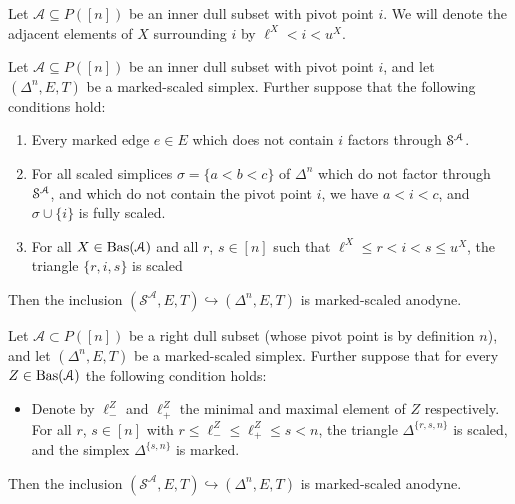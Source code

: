 \documentclass[main.tex]{subfiles}
\begin{document}
\begin{definition}
  Let $\mathcal{A} \subseteq P([n])$ be an inner dull subset with pivot point $i$. We will denote the adjacent elements of $X$ surrounding $i$ by $\ell^{X} < i < u^{X}$.
\end{definition}


\begin{lemma}
  \label{lemma:pivot_trick}
  Let $\mathcal{A} \subseteq P([n])$ be an inner dull subset with pivot point $i$, and let $(\Delta^{n}, E, T)$ be a marked-scaled simplex. Further suppose that the following conditions hold:
  \begin{enumerate}
    \item Every marked edge $e \in E$ which does not contain $i$ factors through $\S^{\mathcal{A}}$.

    \item For all scaled simplices $\sigma = \{a < b < c\}$ of $\Delta^{n}$ which do not factor through $\S^{\mathcal{A}}$, and which do not contain the pivot point $i$, we have $a < i < c$, and $\sigma \cup \{i\}$ is fully scaled.

    \item For all $X \in \Bas(\mathcal{A})$ and all $r$, $s \in [n]$ such that $\ell^{X} \leq r < i < s \leq u^{X}$, the triangle $\{r, i, s\}$ is scaled
  \end{enumerate}

  Then the inclusion $(\mathcal{S}^{\mathcal{A}}, E, T) \hookrightarrow (\Delta^{n}, E, T)$ is marked-scaled anodyne.
\end{lemma}

\begin{lemma}
  \label{lemma:right-anodyne_pivot_trick}
  Let $\mathcal{A} \subset P([n])$ be a right dull subset (whose pivot point is by definition $n$), and let $(\Delta^{n}, E, T)$ be a marked-scaled simplex. Further suppose that for every $Z \in \Bas(\mathcal{A})$ the following condition holds:
  \begin{itemize}
    \item Denote by $\ell^{Z}_{-}$ and $\ell^{Z}_{+}$ the minimal and maximal element of $Z$ respectively. For all $r$, $s \in [n]$ with $r \leq \ell^{Z}_{-} \leq \ell^{Z}_{+} \leq s < n$, the triangle $\Delta^{\{r, s, n\}}$ is scaled, and the simplex $\Delta^{\{s, n\}}$ is marked.
  \end{itemize}

  Then the inclusion $(\mathcal{S}^{\mathcal{A}}, E, T) \hookrightarrow (\Delta^{n}, E, T)$ is marked-scaled anodyne.
\end{lemma}
\end{document}
